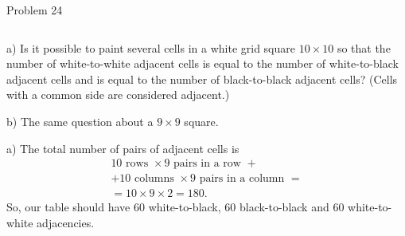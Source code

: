 \documentclass[9pt,aspectratio=169]{beamer}
\begin{document}
\begin{frame}{Problem 24}
  \begin{columns}[T]
    \begin{column}{0.5\textwidth}
      \begin{problem}
        a) Is it possible to paint several cells in a white grid square $10 \times 10$ so that the number of white-to-white adjacent cells is equal to the number of white-to-black adjacent cells and is equal to the number of black-to-black adjacent cells? (Cells with a common side are considered adjacent.)

        b) The same question about a $9 \times 9$ square.
      \end{problem}
      a) The total number of pairs of adjacent cells is 
      \begin{multline*} 
        10\text{ rows }\times 9\text{ pairs in a row } + \\ 
        + 10\text{ columns }\times 9\text{ pairs in a column } =\\
        = 10\times 9\times 2 = 180. 
      \end{multline*} 
      So, our table should have $60$ white-to-black, $60$ black-to-black and $60$ white-to-white adjacencies.
      \smallskip


\end{column}
\end{columns}
\end{frame}
\end{document}

